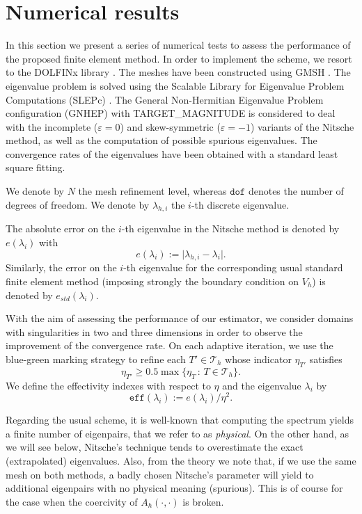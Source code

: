 \documentclass[onefignum,onetabnum,final]{siamart250211}
\def\CT{\mathcal{T}}
\newcommand\eff{\texttt{eff}}
\numberwithin{equation}{section}
\newcommand\0{\boldsymbol{0}}
\def\CT{{\mathcal T}}
\begin{document}
	\section{Numerical results}
	\label{sec:numerical-experiments}
	In this section we present a series of numerical tests to assess the performance of the proposed finite element method. In order to implement the scheme, we resort to the DOLFINx library \cite{barrata2023dolfinx,scroggs2022basix}. The meshes have been constructed using GMSH \cite{geuzaine2009gmsh}. The eigenvalue problem is solved using the Scalable Library for Eigenvalue Problem Computations (SLEPc) \cite{hernandez2005slepc}. The General Non-Hermitian Eigenvalue Problem configuration (GNHEP) with TARGET\_MAGNITUDE is considered to deal with the incomplete ($\varepsilon=0$) and skew-symmetric ($\varepsilon=-1$) variants of the Nitsche method, as well as the computation of possible spurious eigenvalues. The convergence rates of the eigenvalues have been  obtained with a standard least square fitting.  
	
	
	We denote by $N$ the mesh refinement level, whereas $\texttt{dof}$ denotes the number of degrees of freedom.  We denote by $\lambda_{h,i}$ the $i$-th discrete eigenvalue.
	
	The absolute error on the $i$-th eigenvalue in the Nitsche method is denoted by $e(\lambda_i)$ with 
	$$
	e(\lambda_i):=\vert \lambda_{h,i}-\lambda_{i}\vert.
	$$
	Similarly, the error on the $i$-th eigenvalue for the corresponding usual standard finite element method (imposing strongly the boundary condition on $V_h$) is denoted by $e_{std}(\lambda_{i})$.
	
	With the aim of assessing the performance of our estimator,  we consider domains   with singularities in two and three dimensions in order to observe the improvement of the convergence rate.  On each adaptive iteration, we use the blue-green marking strategy to refine each $T'\in \CT_{h}$ whose indicator $\eta_{T'}$ satisfies
		$$
		\eta_{T'}\geq 0.5\max\{\eta_{T}\,:\,T\in\CT_{h} \}.
		$$
		We define the effectivity indexes with respect to $\eta$ and the eigenvalue $\lambda_i$ by 
		$$\eff(\lambda_i):=e(\lambda_i)/\eta^2.$$
	
	Regarding the usual scheme, it is well-known that computing the spectrum yields a finite number of eigenpairs, that we refer to as \textit{physical}. On the other hand, as we will see below, Nitsche's technique tends to overestimate the exact (extrapolated) eigenvalues. Also, from the theory we note that, if we use the same mesh on both methods, a badly chosen Nitsche’s parameter will yield to additional eigenpairs with no physical meaning (spurious). This is of course for the case when the coercivity of $A_h(\cdot,\cdot)$ is broken.
	
\end{document}
